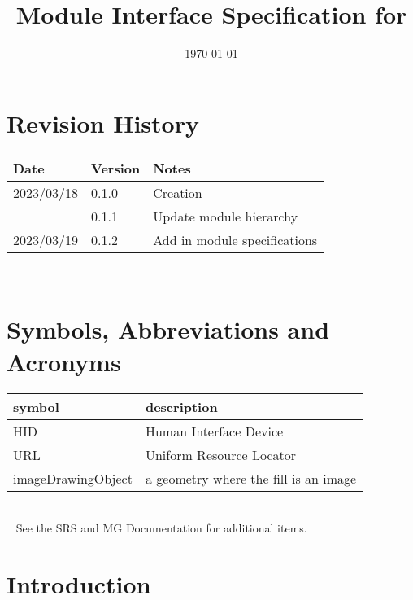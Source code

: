 \documentclass[12pt, titlepage]{article}
\begin{document}
\title{Module Interface Specification for \progname{}}

\author{\authname}

\date{\today}

\maketitle


\section{Revision History}

\begin{tabularx}{\textwidth}{p{3cm}p{2cm}X}
\toprule {\bf Date} & {\bf Version} & {\bf Notes}\\
\midrule
2023/03/18 & 0.1.0 & Creation\\
           & 0.1.1 & Update module hierarchy\\
2023/03/19 & 0.1.2 & Add in module specifications\\
\bottomrule
\end{tabularx}

~\newpage

\section{Symbols, Abbreviations and Acronyms}

\renewcommand{\arraystretch}{1.2}
\begin{tabular}{l l} 
  \toprule		
  \textbf{symbol} & \textbf{description}\\
  \midrule 
  HID & Human Interface Device\\
  URL & Uniform Resource Locator\\
  imageDrawingObject & a geometry where the fill is an image\\
  \bottomrule
\end{tabular}\\

~\newline
\noindent See the SRS \cite{SRS} and MG \cite{MG} Documentation for additional items.

\newpage

\tableofcontents

\newpage


\section{Introduction}
\end{document}
